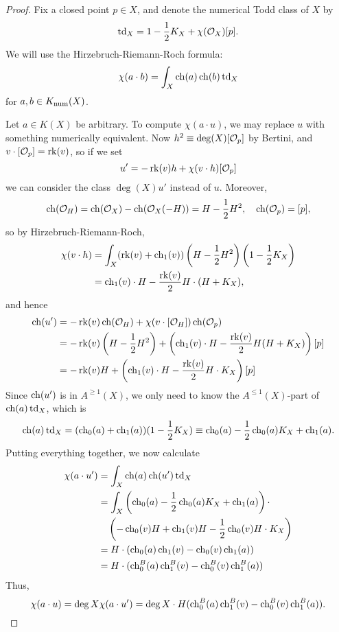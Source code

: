 \begin{proof}
    Fix a closed point $p \in X$, and denote the numerical Todd class of $X$ by
    \[ \td_X = 1 - \frac{1}{2} K_X + \chi(\Oh_X) [p]. \]
    We will use the Hirzebruch-Riemann-Roch formula:
    \[ \chi(a \cdot b) = \int_X \ch(a) \ch(b) \td_X \]
    for $a, b \in \Kn(X)$.
    
    Let $a \in K(X)$ be arbitrary. To compute $\chi(a \cdot u)$, we may replace $u$ with something numerically equivalent. Now $h^2 \equiv \deg(X) [\Oh_p]$ by Bertini, and $v \cdot [\Oh_p] = \rk(v)$, so if we set
    \[ u' = - \rk(v) h + \chi(v \cdot h) [\Oh_p] \]
    we can consider the class $\deg(X) u'$ instead of $u$. Moreover, 
    \[ \ch(\Oh_H) = \ch(\Oh_X) - \ch(\Oh_X(-H)) = H - \frac{1}{2} H^2, \quad \ch(\Oh_p) = [p], \]
    so by Hirzebruch-Riemann-Roch,
    \begin{align*}
        \chi(v \cdot h) & = \int_X (\rk(v) + \ch_1(v))\left(H - \frac{1}{2}H^2\right)\left(1 - \frac{1}{2}K_X\right) \\
        & = \ch_1(v) \cdot H - \frac{\rk(v)}{2} H\cdot(H + K_X),
    \end{align*}
    and hence
    \begin{align*}
        \ch(u') & = -\rk(v) \ch(\Oh_H) + \chi(v \cdot [\Oh_H]) \ch(\Oh_p) \\
        & = -\rk(v)\left(H - \frac{1}{2}H^2\right) + \left(\ch_1(v) \cdot H - \frac{\rk(v)}{2} H(H + K_X)\right)[p] \\
        & = -\rk(v) H + \left(\ch_1(v) \cdot H - \frac{\rk(v)}{2} H \cdot K_X\right)[p]
    \end{align*}
    Since $\ch(u')$ is in $A^{\ge 1}(X)$, we only need to know the $A^{\le 1}(X)$-part of $\ch(a)\td_X$, which is
    \[ \ch(a) \td_X = (\ch_0(a) + \ch_1(a)) (1 - \frac{1}{2} K_X) \equiv \ch_0(a) - \frac{1}{2} \ch_0(a) K_X + \ch_1(a). \]
    Putting everything together, we now calculate
    \begin{align*}
        \chi(a \cdot u') & = \int_X \ch(a) \ch(u') \td_X \\
        & = \int_X \left(\ch_0(a) - \frac{1}{2} \ch_0(a) K_X + \ch_1(a)\right)\cdot  \\
        & \quad\left(-\ch_0(v) H + \ch_1(v) H - \frac{1}{2} \ch_0(v) H \cdot K_X\right) \\
        & = H \cdot (\ch_0(a) \ch_1(v) - \ch_0(v) \ch_1(a)) \\
        & = H \cdot (\ch^B_0(a) \ch^B_1(v) - \ch^B_0(v) \ch^B_1(a))
    \end{align*}
    Thus,
    \[ \chi(a \cdot u) = \deg X \chi(a \cdot u') = \deg X \cdot H (\ch^B_0(a) \ch^B_1(v) - \ch^B_0(v) \ch^B_1(a)). \]
    

\end{proof}

